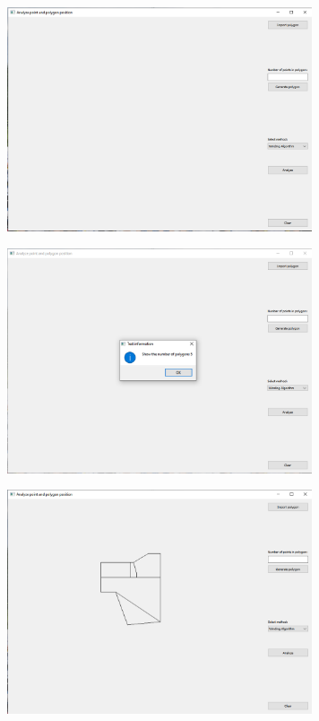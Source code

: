 \documentclass[12pt]{article}
\begin{document}
\begin{center}
   \includegraphics[width=9cm]{./img/import.png}
\end{center}

\begin{center}
   \includegraphics[width=9cm]{./img/import2.png}
\end{center}

\begin{center}
   \includegraphics[width=9cm]{./img/import3.png}
\end{center}
\end{document}
